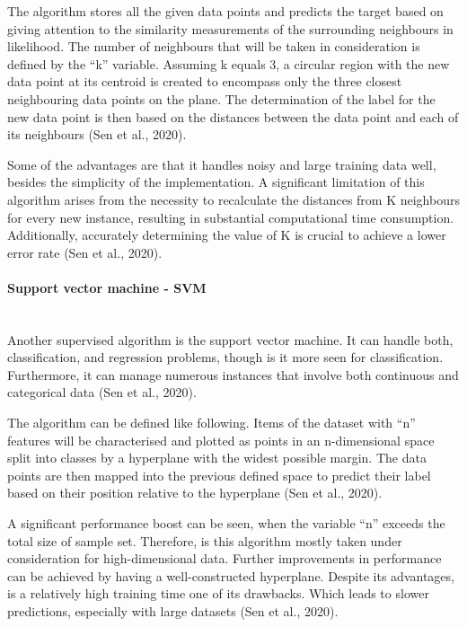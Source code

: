 \documentclass{article}
\begin{document}
\begin{multicols}{2}
The algorithm stores all the given data points and predicts the target based on giving attention to the similarity measurements of the surrounding neighbours in likelihood. The number of neighbours that will be taken in consideration is defined by the “k” variable. Assuming k equals 3, a circular region with the new data point at its centroid is created to encompass only the three closest neighbouring data points on the plane. The determination of the label for the new data point is then based on the distances between the data point and each of its neighbours (Sen et al., 2020).

Some of the advantages are that it handles noisy and large training data well, besides the simplicity of the implementation. A significant limitation of this algorithm arises from the necessity to recalculate the distances from K neighbours for every new instance, resulting in substantial computational time consumption. Additionally, accurately determining the value of K is crucial to achieve a lower error rate (Sen et al., 2020).

\paragraph*{\textbf{Support vector machine - SVM}}\mbox{}\\
Another supervised algorithm is the support vector machine. It can handle both, classification, and regression problems, though is it more seen for classification. Furthermore, it can manage numerous instances that involve both continuous and categorical data (Sen et al., 2020).

The algorithm can be defined like following. Items of the dataset with “n” features will be characterised and plotted as points in an n-dimensional space split into classes by a hyperplane with the widest possible margin. The data points are then mapped into the previous defined space to predict their label based on their position relative to the hyperplane (Sen et al., 2020).

A significant performance boost can be seen, when the variable “n” exceeds the total size of sample set. Therefore, is this algorithm mostly taken under consideration for high-dimensional data. Further improvements in performance can be achieved by having a well-constructed hyperplane. Despite its advantages, is a relatively high training time one of its drawbacks. Which leads to slower predictions, especially with large datasets (Sen et al., 2020).



\end{multicols}
\end{document}
